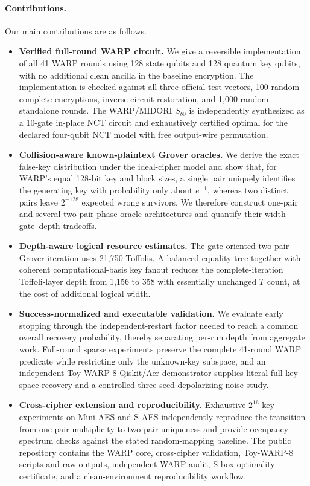 \documentclass[pdflatex,sn-nature]{sn-jnl}
\theoremstyle{thmstyleone}
\theoremstyle{thmstyletwo}
\begin{document}
\paragraph{Contributions.}
Our main contributions are as follows.
\begin{itemize}
    \item \textbf{Verified full-round WARP circuit.} We give a reversible implementation of all 41 WARP rounds using 128 state qubits and 128 quantum key qubits, with no additional clean ancilla in the baseline encryption. The implementation is checked against all three official test vectors, 100 random complete encryptions, inverse-circuit restoration, and 1,000 random standalone rounds. The WARP/MIDORI $S_{b0}$ is independently synthesized as a 10-gate in-place NCT circuit and exhaustively certified optimal for the declared four-qubit NCT model with free output-wire permutation.
    \item \textbf{Collision-aware known-plaintext Grover oracles.} We derive the exact false-key distribution under the ideal-cipher model and show that, for WARP's equal 128-bit key and block sizes, a single pair uniquely identifies the generating key with probability only about $e^{-1}$, whereas two distinct pairs leave $2^{-128}$ expected wrong survivors. We therefore construct one-pair and several two-pair phase-oracle architectures and quantify their width--gate--depth tradeoffs.
    \item \textbf{Depth-aware logical resource estimates.} The gate-oriented two-pair Grover iteration uses 21,750 Toffolis. A balanced equality tree together with coherent computational-basis key fanout reduces the complete-iteration Toffoli-layer depth from 1,156 to 358 with essentially unchanged $T$ count, at the cost of additional logical width.
    \item \textbf{Success-normalized and executable validation.} We evaluate early stopping through the independent-restart factor needed to reach a common overall recovery probability, thereby separating per-run depth from aggregate work. Full-round sparse experiments preserve the complete 41-round WARP predicate while restricting only the unknown-key subspace, and an independent Toy-WARP-8 Qiskit/Aer demonstrator supplies literal full-key-space recovery and a controlled three-seed depolarizing-noise study.
    \item \textbf{Cross-cipher extension and reproducibility.} Exhaustive $2^{16}$-key experiments on Mini-AES and S-AES independently reproduce the transition from one-pair multiplicity to two-pair uniqueness and provide occupancy-spectrum checks against the stated random-mapping baseline. The public repository contains the WARP core, cross-cipher validation, Toy-WARP-8 scripts and raw outputs, independent WARP audit, S-box optimality certificate, and a clean-environment reproducibility workflow.
\end{itemize}
\end{document}

